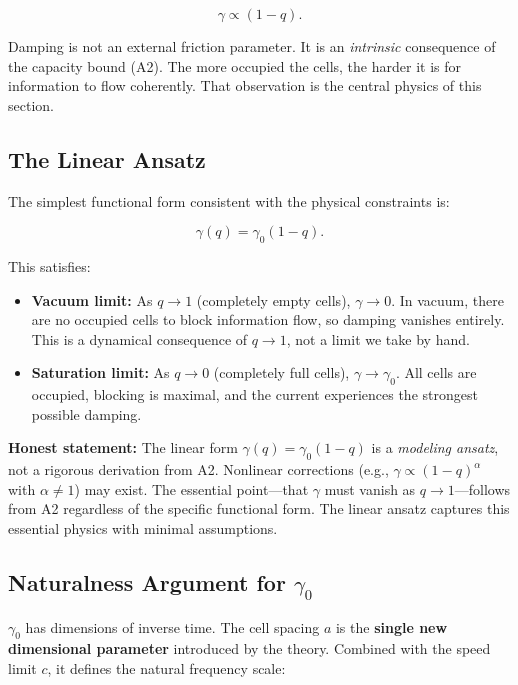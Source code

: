 \documentclass[aps,prd,twocolumn,showpacs,superscriptaddress,preprintnumbers]{revtex4-2}
\begin{document}
\begin{equation}
\gamma \propto (1-q).
\label{eq:gamma_scaling}
\end{equation}

Damping is not an external friction parameter.
It is an \emph{intrinsic} consequence of the capacity bound (A2).
The more occupied the cells, the harder it is for information to flow coherently.
That observation is the central physics of this section.

\subsection{The Linear Ansatz}

The simplest functional form consistent with the physical constraints is:

\begin{equation}
\boxed{\gamma(q) = \gamma_0 (1-q)}.
\label{eq:gamma_linear}
\end{equation}

This satisfies:

\begin{itemize}
    \item \textbf{Vacuum limit:} As $q\to 1$ (completely empty cells), $\gamma\to 0$. In vacuum, there are no occupied cells to block information flow, so damping vanishes entirely. This is a dynamical consequence of $q\to 1$, not a limit we take by hand.
    \item \textbf{Saturation limit:} As $q\to 0$ (completely full cells), $\gamma\to\gamma_0$. All cells are occupied, blocking is maximal, and the current experiences the strongest possible damping.
\end{itemize}

\textbf{Honest statement:} The linear form $\gamma(q)=\gamma_0(1-q)$ is a \emph{modeling ansatz}, not a rigorous derivation from A2.
Nonlinear corrections (e.g., $\gamma\propto(1-q)^\alpha$ with $\alpha\neq 1$) may exist.
The essential point---that $\gamma$ must vanish as $q\to 1$---follows from A2 regardless of the specific functional form.
The linear ansatz captures this essential physics with minimal assumptions.

\subsection{Naturalness Argument for $\gamma_0$}
\label{sec:naturalness}

$\gamma_0$ has dimensions of inverse time.
The cell spacing $a$ is the \textbf{single new dimensional parameter} introduced by the theory.
Combined with the speed limit $c$, it defines the natural frequency scale:
\end{document}
